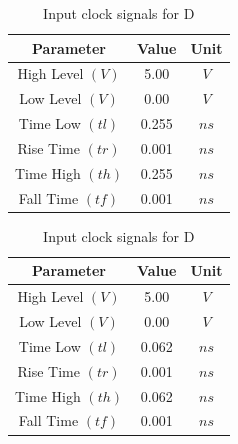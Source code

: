 \documentclass[a4paper,12pt]{article}
\begin{document}
\begin{table}[H]
				\begin{subtable}[t]{0.48\textwidth} %
				\centering
				\begin{tabular}{|c|c|c|}
					\hline
					\textbf{Parameter}          & \textbf{Value} & \textbf{Unit} \\ \hline
					High Level $(V)$            & 5.00           & $V$           \\ \hline
					Low Level $(V)$             & 0.00           & $V$           \\ \hline
					Time Low $(tl)$             & 0.255          & $ns$          \\ \hline
					Rise Time $(tr)$            & 0.001          & $ns$          \\ \hline
					Time High $(th)$            & 0.255          & $ns$          \\ \hline
					Fall Time $(tf)$            & 0.001          & $ns$          \\ \hline
				\end{tabular}
				\caption{Input clock signals for C} %
			\end{subtable}
			\hfil
			\begin{subtable}[t]{0.48\textwidth} %
				\centering
				\begin{tabular}{|c|c|c|}
					\hline
					\textbf{Parameter}          & \textbf{Value} & \textbf{Unit} \\ \hline
					High Level $(V)$            & 5.00           & $V$           \\ \hline
					Low Level $(V)$             & 0.00           & $V$           \\ \hline
					Time Low $(tl)$             & 0.062        & $ns$          \\ \hline
					Rise Time $(tr)$            & 0.001          & $ns$          \\ \hline
					Time High $(th)$            & 0.062          & $ns$          \\ \hline
					Fall Time $(tf)$            & 0.001         & $ns$          \\ \hline
				\end{tabular}
				\caption{Input clock signals for D} %
			\end{subtable}
			
			
			

\end{table}
\end{document}

